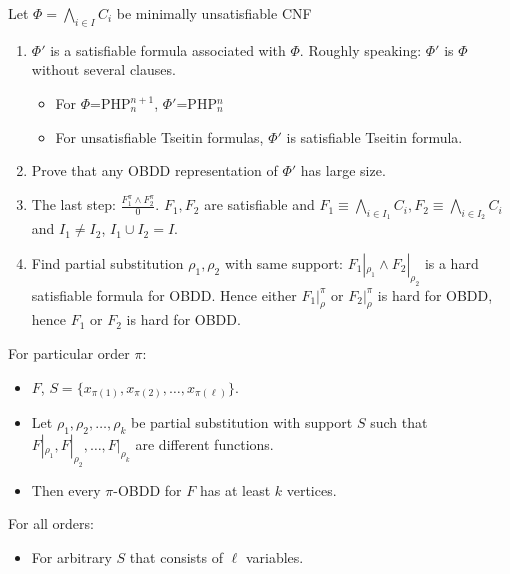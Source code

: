 {
Let $\Phi=\bigwedge_{i\in I} C_i$ be minimally unsatisfiable CNF
\begin{enumerate}
\item $\Phi'$ is a satisfiable formula associated with $\Phi$. Roughly speaking: $\Phi'$ is $\Phi$ without several clauses.
\begin{itemize}
   \item For $\Phi$=PHP$^{n+1}_{n}$, $\Phi'$=PHP$^{n}_{n}$
   \item For unsatisfiable Tseitin formulas, $\Phi'$ is satisfiable Tseitin formula.
\end{itemize}
\item Prove that any OBDD representation of $\Phi'$ has large size.
\item The last step: $\frac{F_1^{\pi}\land F_2^{\pi}}{0}$. $F_1, F_2$ are satisfiable and $F_1\equiv \bigwedge_{i\in I_1} C_i, F_2\equiv \bigwedge_{i\in I_2} C_i$
and $I_1\neq I_2$, $I_1\cup I_2=I$.
\item Find partial substitution $\rho_1, \rho_2$ with same support: $F_1|_{\rho_1} \land F_2|_{\rho_2}$ is a hard satisfiable formula for OBDD.
Hence either $F_1|_{\rho}^{\pi}$ or $F_2|_{\rho}^{\pi}$ is hard for OBDD, hence $F_1$ or $F_2$ is hard for OBDD.                                                                 
\end{enumerate}
}

{
For particular order $\pi$:
\begin{itemize}
\item $F$, $S=\{x_{\pi(1)}, x_{\pi(2)}, \dots, x_{\pi(\ell)} \}$.
\item Let $\rho_1,\rho_2,\dots, \rho_k$ be partial substitution with support $S$ such that
$F|_{\rho_1}, F|_{\rho_2},\dots,F|_{\rho_k}$ are different functions.
\item Then every $\pi$-OBDD for $F$ has at least $k$ vertices.
\end{itemize}

\pause
For all orders:
\begin{itemize}
\item For arbitrary $S$ that consists of $\ell$ variables.
\end{itemize}

}


